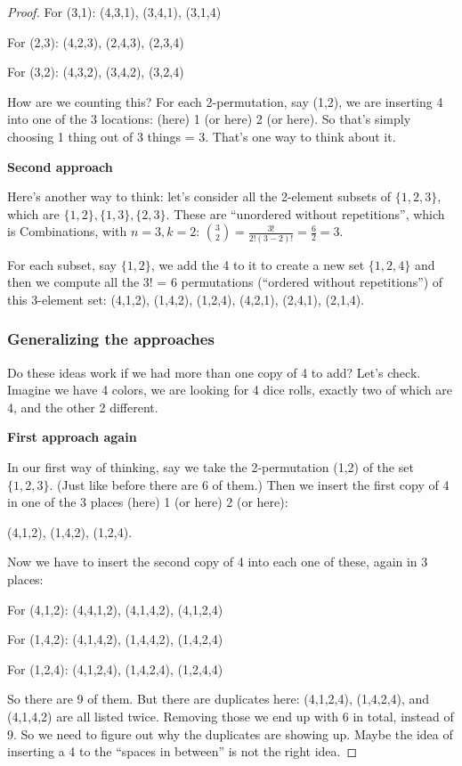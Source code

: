 \documentclass[14pt]{extarticle}
\begin{document}
\begin{proof}
For (3,1): (4,3,1), (3,4,1), (3,1,4)

For (2,3): (4,2,3), (2,4,3), (2,3,4)

For (3,2): (4,3,2), (3,4,2), (3,2,4)

How are we counting this? For each 2-permutation, say (1,2), we are inserting 4 into one of the 3 locations: (here) 1 (or here) 2 (or here). So that's simply choosing 1 thing out of 3 things = 3. That's one way to think about it. 

{\bf Second approach}

Here's another way to think: let's consider all the 2-element subsets of $\{1, 2, 3\}$, which are $\{1,2\}, \{1,3\}, \{2,3\}$. These are ``unordered without repetitions'', which is Combinations, with $n = 3, k = 2$: $\binom{3}{2} = \frac{3!}{2!(3-2)!} = \frac{6}{2} = 3$.

For each subset, say $\{1,2\}$, we add the 4 to it to create a new set $\{1,2,4\}$ and then we compute all the 3! = 6 permutations (``ordered without repetitions'') of this 3-element set: (4,1,2), (1,4,2), (1,2,4), (4,2,1), (2,4,1), (2,1,4).

\subsubsection{Generalizing the approaches}
Do these ideas work if we had more than one copy of 4 to add? Let's check. Imagine we have 4 colors, we are looking for 4 dice rolls, exactly two of which are 4, and the other 2 different.

{\bf First approach again}

In our first way of thinking, say we take the 2-permutation (1,2) of the set $\{1,2,3\}$. (Just like before there are 6 of them.) Then we insert the first copy of 4 in one of the 3 places (here) 1 (or here) 2 (or here):

(4,1,2), (1,4,2), (1,2,4).

Now we have to insert the second copy of 4 into each one of these, again in 3 places:

For (4,1,2): (4,4,1,2), (4,1,4,2), (4,1,2,4)

For (1,4,2): (4,1,4,2), (1,4,4,2), (1,4,2,4)

For (1,2,4): (4,1,2,4), (1,4,2,4), (1,2,4,4)

So there are 9 of them. But there are duplicates here: (4,1,2,4), (1,4,2,4), and (4,1,4,2) are all listed twice. Removing those we end up with 6 in total, instead of 9. So we need to figure out why the duplicates are showing up. Maybe the idea of inserting a 4 to the ``spaces in between'' is not the right idea.


\end{proof}
\end{document}
